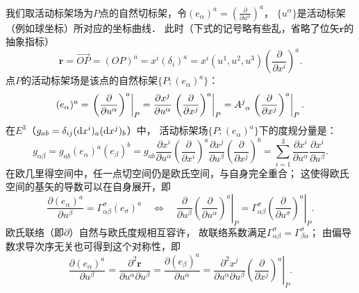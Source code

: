 我们取活动标架场为$P$点的自然切标架，令$(e_\alpha)^a= (\frac{\partial}{\partial u^\alpha})^a$，
$\{u^\alpha\}$是活动标架（例如球坐标）所对应的坐标曲线．
此时（下式的记号略有些乱，省略了位矢$\boldsymbol{r}$的抽象指标）
\begin{equation}
    \boldsymbol{r}=\overrightarrow{OP}= (OP)^a = x^i (\delta_i)^a 
    = x^i(u^1,u^2,u^3) \left(\frac{\partial}{\partial x^i}\right)^a .
\end{equation}
点$P$的活动标架场是该点的自然标架$\{P;(e_\alpha)^a\}$：
\begin{equation}
    (e_\alpha)^a = \left.\left(\frac{\partial}{\partial u^\alpha}\right)^a\right|_{P}
    =\frac{\partial x^j}{\partial u^\alpha}
    \left.\left(\frac{\partial}{\partial x^j}\right)^a \right|_{P}
    =A^j_{\hphantom{j} \alpha} \left.\left(\frac{\partial}{\partial x^j}\right)^a\right|_{P} .
\end{equation}
在$E^3$（$g_{ab}=\delta_{ij}({\rm d}x^i)_a ({\rm d}x^j)_b$）中，
活动标架场$\{P;(e_\alpha)^a\}$下的度规分量是：
\begin{equation}\label{chrg:eqn_gabEuclid}
    g_{\alpha\beta}= g_{ab}(e_\alpha)^a (e_\beta)^b
    =g_{ab} \frac{\partial x^i}{\partial u^\alpha} \left(\frac{\partial}{\partial x^i}\right)^a
    \frac{\partial x^j}{\partial u^\beta} \left(\frac{\partial}{\partial x^j}\right)^b
    = \sum_{i=1}^{3}\frac{\partial x^i}{\partial u^\alpha}\frac{\partial x^i}{\partial u^\beta} .
\end{equation}
在欧几里得空间中，任一点切空间仍是欧氏空间，与自身完全重合；
这使得欧氏空间的基矢的导数可以在自身展开，即
\begin{equation}\label{chrg:eqn_tmpr23}
    \frac{\partial (e_\alpha)^a }{\partial u^\beta} = \Gamma^\sigma_{\alpha\beta} (e_\sigma)^a  
    \quad \Leftrightarrow \quad
    \frac{\partial }{\partial u^\beta} \left.\left(\frac{\partial}{\partial u^\alpha}\right)^a\right|_{P}
    = \Gamma^\sigma_{\alpha\beta} \left.\left(\frac{\partial}{\partial u^\sigma}\right)^a \right|_{P}.
\end{equation}
欧氏联络（即$\partial$）自然与欧氏度规相互容许，
故联络系数满足$\Gamma^\sigma_{\alpha\beta}=\Gamma^\sigma_{\beta\alpha}$；
由偏导数求导次序无关也可得到这个对称性，即
\begin{equation}\label{chrg:eqn_tmpra32}
    \frac{\partial (e_\alpha)^a }{\partial u^\beta}
    =\frac{\partial^2 \boldsymbol{r}}{\partial u^\alpha \partial u^\beta}
    =\frac{\partial (e_\beta)^a }{\partial u^\alpha}
    =\frac{\partial^2 x^j}{\partial u^\alpha\partial u^\beta}
    \left. \left(\frac{\partial}{\partial x^j}\right)^a \right|_{P}.
\end{equation}
